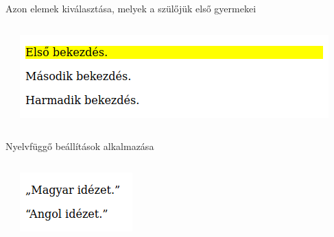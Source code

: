 \begin{frame}
  Azon elemek kiválasztása, melyek a szülőjük első gyermekei
  \begin{columns}[c]
      \begin{exampleblock}{}
        \scriptsize
        
        
      \end{exampleblock}
      \includegraphics[width=\textwidth]{firstchild.png}
  \end{columns}
\end{frame}

\begin{frame}
  Nyelvfüggő beállítások alkalmazása
  \begin{columns}[c]
      \begin{exampleblock}{}
        \scriptsize
        
        
      \end{exampleblock}
      \includegraphics[width=\textwidth]{lang.png}
  \end{columns}
\end{frame}

